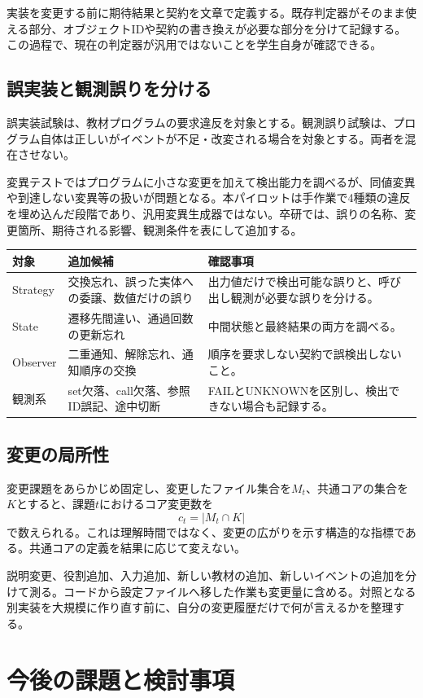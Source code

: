 \documentclass[a4paper,11pt]{ltjsarticle}
\begin{document}
実装を変更する前に期待結果と契約を文章で定義する。既存判定器がそのまま使える部分、オブジェクトIDや契約の書き換えが必要な部分を分けて記録する。この過程で、現在の判定器が汎用ではないことを学生自身が確認できる。

\subsection{誤実装と観測誤りを分ける}
誤実装試験は、教材プログラムの要求違反を対象とする。観測誤り試験は、プログラム自体は正しいがイベントが不足・改変される場合を対象とする。両者を混在させない。

変異テストではプログラムに小さな変更を加えて検出能力を調べるが、同値変異や到達しない変異等の扱いが問題となる\cite{mutation}。本パイロットは手作業で4種類の違反を埋め込んだ段階であり、汎用変異生成器ではない。卒研では、誤りの名称、変更箇所、期待される影響、観測条件を表にして追加する。

\begin{longtable}{P{28mm}P{62mm}P{60mm}}
\toprule
対象 & 追加候補 & 確認事項\\\midrule
\endhead
Strategy & 交換忘れ、誤った実体への委譲、数値だけの誤り & 出力値だけで検出可能な誤りと、呼び出し観測が必要な誤りを分ける。\\
State & 遷移先間違い、通過回数の更新忘れ & 中間状態と最終結果の両方を調べる。\\
Observer & 二重通知、解除忘れ、通知順序の交換 & 順序を要求しない契約で誤検出しないこと。\\
観測系 & set欠落、call欠落、参照ID誤記、途中切断 & FAILとUNKNOWNを区別し、検出できない場合も記録する。\\
\bottomrule
\end{longtable}

\subsection{変更の局所性}
変更課題をあらかじめ固定し、変更したファイル集合を$M_t$、共通コアの集合を$K$とすると、課題$t$におけるコア変更数を
\[
 c_t=|M_t\cap K|
\]
で数えられる。これは理解時間ではなく、変更の広がりを示す構造的な指標である。共通コアの定義を結果に応じて変えない。

説明変更、役割追加、入力追加、新しい教材の追加、新しいイベントの追加を分けて測る。コードから設定ファイルへ移した作業も変更量に含める。対照となる別実装を大規模に作り直す前に、自分の変更履歴だけで何が言えるかを整理する。
\clearpage

\section{今後の課題と検討事項}
\end{document}
